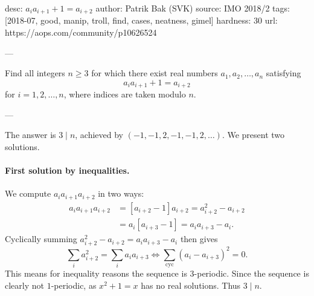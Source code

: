 desc: $a_i a_{i+1} + 1 = a_{i+2}$
author: Patrik Bak (SVK)
source: IMO 2018/2
tags: [2018-07, good, manip, troll, find, cases, neatness, gimel]
hardness: 30
url: https://aops.com/community/p10626524

---

Find all integers $n \geq 3$ for which
there exist real numbers $a_1, a_2, \dots, a_n$ satisfying
\[ a_i a_{i+1} +1 = a_{i+2} \]
for $i=1,2, \dots, n$, where indices are taken modulo $n$.

---

The answer is $3 \mid n$,
achieved by $(-1,-1,2,-1,-1,2,\dots)$.
We present two solutions.

\paragraph{First solution by inequalities.}
We compute $a_i a_{i+1} a_{i+2}$ in two ways:
\begin{align*}
  a_i a_{i+1} a_{i+2} &= [a_{i+2}-1]a_{i+2} = a_{i+2}^2 - a_{i+2} \\
  &= a_i [a_{i+3}-1] = a_i a_{i+3} - a_i.
\end{align*}
Cyclically summing $a_{i+2}^2 - a_{i+2} = a_i a_{i+3} - a_i$ then gives
\[ \sum_i a_{i+2}^2 = \sum_i a_i a_{i+3}
  \iff \sum_{\text{cyc}} \left( a_i - a_{i+3} \right)^2 = 0.  \]
This means for inequality reasons the sequence is $3$-periodic.
Since the sequence is clearly not $1$-periodic,
as $x^2 + 1 = x$ has no real solutions.
Thus $3 \mid n$.

